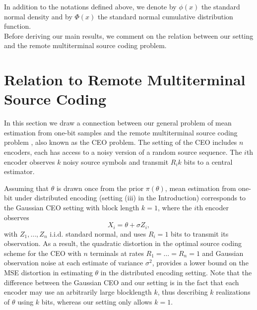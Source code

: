 \documentclass[letterpaper, conference]{IEEEtran}      %
\begin{document}

In addition to the notations defined above, we denote by $\phi(x)$ the standard normal density and by $\Phi(x)$ the standard normal cumulative distribution function. \\%

Before deriving our main results, we comment on the relation between our setting and the remote multiterminal source coding problem. 

\section{Relation to Remote Multiterminal Source Coding \label{sec:ceo}}
In this section we draw a connection between our general problem of mean estimation from one-bit samples and the remote multiterminal source coding problem \cite{berger1996ceo}, also known as the CEO problem. The setting of the CEO includes $n$ encoders, each has access to a noisy version of a random source sequence. 
The $i$th encoder observes $k$ noisy source symbols and transmit $R_i k$ bits to a central estimator. \par
Assuming that $\theta$ is drawn once from the prior $\pi(\theta)$, mean estimation from one-bit under distributed encoding (setting (iii) in the Introduction) corresponds to the Gaussian CEO setting with block length $k=1$, where the $i$th encoder observes
\begin{equation}
\label{eq:Gaussian_channel}
X_i = \theta + \sigma Z_i,
\end{equation}
with $Z_1,\ldots,Z_n$ i.i.d. standard normal, and uses $R_i=1$ bits to transmit its observation. As a result, the quadratic distortion in the optimal source coding scheme for the CEO with $n$ terminals at rates $R_1 = \ldots = R_n = 1$ and Gaussian observation noise at each estimate of variance $\sigma^2$, provides a lower bound on the MSE distortion in estimating $\theta$ in the distributed encoding setting. Note that the difference between the Gaussian CEO and our setting is in the fact that each encoder may use an arbitrarily large blocklength $k$, thus describing $k$ realizations of $\theta$ using $k$ bits, whereas our setting only allows $k=1$. 
 \\
\end{document}
